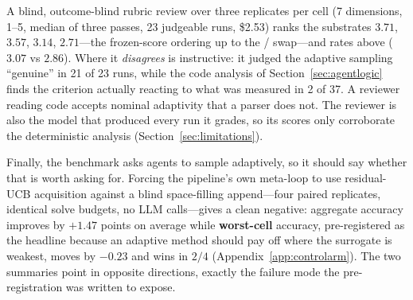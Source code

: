 A blind, outcome-blind rubric review over three replicates per cell (7
dimensions, 1--5, median of three passes, 23 judgeable runs, \$2.53) ranks the
\Lthree{} substrates  $3.71$,  $3.57$,  $3.14$,
 $2.71$---the frozen-score ordering up to the /
swap---and rates \Lthree{} above \Ltwo{} ($3.07$ vs $2.86$). Where it
\emph{disagrees} is instructive: it judged the adaptive sampling ``genuine'' in
21 of 23 runs, while the code analysis of Section~\ref{sec:agentlogic} finds the
criterion actually reacting to what was measured in 2 of 37. A reviewer reading
code accepts nominal adaptivity that a parser does not. The reviewer is also the
model that produced every run it grades, so its scores only corroborate the
deterministic analysis (Section~\ref{sec:limitations}).

Finally, the benchmark asks agents to sample adaptively, so it should say
whether that is worth asking for. Forcing the pipeline's own meta-loop to use
residual-UCB acquisition against a blind space-filling append---four paired
replicates, identical solve budgets, no LLM calls---gives a clean negative:
aggregate accuracy improves by $+1.47$ points on average while
\textbf{worst-cell} accuracy, pre-registered as the headline because an adaptive
method should pay off where the surrogate is weakest, moves by $-0.23$ and wins
in $2/4$ (Appendix~\ref{app:controlarm}). The two summaries point in opposite
directions, exactly the failure mode the pre-registration was written to
expose.
